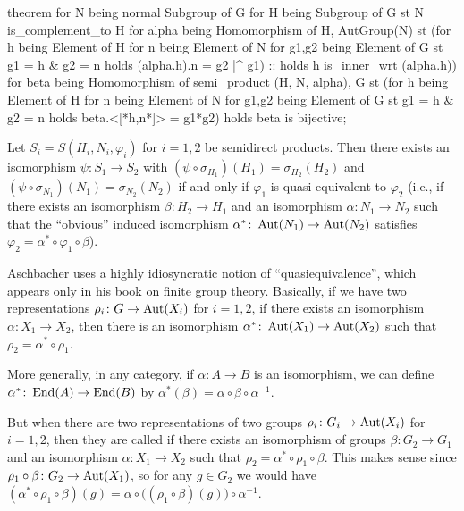 \begin{mizar}
theorem
  for N being normal Subgroup of G
  for H being Subgroup of G st N is_complement_to H
  for alpha being Homomorphism of H, AutGroup(N)
  st (for h being Element of H
      for n being Element of N
      for g1,g2 being Element of G st g1 = h & g2 = n
      holds (alpha.h).n = g2 |^ g1) :: holds h is_inner_wrt (alpha.h))
  for beta being Homomorphism of semi_product (H, N, alpha), G
  st (for h being Element of H
      for n being Element of N
      for g1,g2 being Element of G st g1 = h & g2 = n
      holds beta.<[*h,n*]> = g1*g2)
  holds beta is bijective;
\end{mizar}

\begin{theorem}
Let $S_{i}=S(H_{i}, N_{i}, \varphi_{i})$ for $i=1,2$ be semidirect products.
Then there exists an isomorphism $\psi\colon S_{1}\to S_{2}$ with
$(\psi\circ\sigma_{H_{1}})(H_{1})=\sigma_{H_{2}}(H_{2})$ and
$(\psi\circ\sigma_{N_{1}})(N_{1})=\sigma_{N_{2}}(N_{2})$ if and only if
$\varphi_{1}$ is quasi-equivalent to $\varphi_{2}$ (i.e., if there
exists an isomorphism $\beta\colon H_{2}\to H_{1}$ and an isomorphism
$\alpha\colon N_{1}\to N_{2}$ such that the ``obvious'' induced isomorphism
$\alpha^{*}\colon\operatorname{Aut}(N_{1})\to\operatorname{Aut}(N_{2})$
satisfies $\varphi_{2}=\alpha^{*}\circ\varphi_{1}\circ\beta$).
\end{theorem}

\begin{thm-remark}
Aschbacher uses a highly idiosyncratic notion of ``quasiequivalence'',
which appears only in his book on finite group theory.
Basically, if we have two representations $\rho_{i}\colon G\to\operatorname{Aut}(X_{i})$
for $i=1,2$, if there exists an isomorphism $\alpha\colon X_{1}\to X_{2}$,
then there is an isomorphism $\alpha^{*}\colon\operatorname{Aut}(X_{1})\to\operatorname{Aut}(X_{2})$
such that $\rho_{2}=\alpha^{*}\circ\rho_{1}$. 

More generally, in any category, if $\alpha\colon A\to B$ is an
isomorphism, we can define $\alpha^{*}\colon\operatorname{End}(A)\to\operatorname{End}(B)$ by
$\alpha^{*}(\beta)=\alpha\circ\beta\circ\alpha^{-1}$.

But when there are two representations of two groups
$\rho_{i}\colon G_{i}\to\operatorname{Aut}(X_{i})$ for $i=1,2$, then they are called
 if there exists an isomorphism of groups
$\beta\colon G_{2}\to G_{1}$ and an isomorphism $\alpha\colon X_{1}\to X_{2}$
such that $\rho_{2}=\alpha^{*}\circ\rho_{1}\circ\beta$.
This makes sense since $\rho_{1}\circ\beta\colon G_{2}\to\operatorname{Aut}(X_{1})$,
so for any $g\in G_{2}$ we would have
$(\alpha^{*}\circ\rho_{1}\circ\beta)(g)=\alpha\circ\bigl((\rho_{1}\circ\beta)(g)\bigr)\circ\alpha^{-1}$.
\end{thm-remark}


